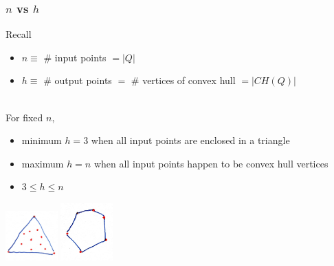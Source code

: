 \documentclass{beamer}
\newcommand{\stanza}{ \\~\ }
\begin{document}
\begin{frame} \frametitle{$n$ vs $h$}
  Recall
  \begin{itemize}
    \item $n \equiv $ \# input points $= |Q|$
    \item $h \equiv $ \# output points $=$ \# vertices of convex hull $= |CH(Q)|$
    \stanza
  \end{itemize}

  For fixed $n,$
  \begin{itemize}
    \item minimum $h = 3$ when all input points are enclosed in a triangle
    \item maximum $h = n$ when all input points happen to be convex hull vertices
    \item $ 3 \leq h \leq n $
  \end{itemize}

  \begin{center}
    \includegraphics[width=2cm]{convex_hull_smallest_output.jpg}
    \hspace{.5cm}
    \includegraphics[width=2cm]{convex_hull_largest_output.jpg}
  \end{center}

\end{frame}
\end{document}
